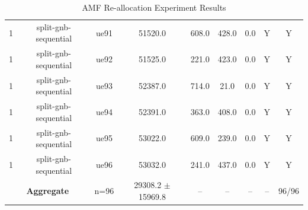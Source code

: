 \begin{table}[ht]
\begin{tabular}{|c|c|c|c|c|c|c|c|c|}
1 & split-gnb-sequential & ue91 & 51520.0 & 608.0 & 428.0 & 0.0 & Y & Y \\
1 & split-gnb-sequential & ue92 & 51525.0 & 221.0 & 423.0 & 0.0 & Y & Y \\
1 & split-gnb-sequential & ue93 & 52387.0 & 714.0 & 21.0 & 0.0 & Y & Y \\
1 & split-gnb-sequential & ue94 & 52391.0 & 363.0 & 408.0 & 0.0 & Y & Y \\
1 & split-gnb-sequential & ue95 & 53022.0 & 609.0 & 239.0 & 0.0 & Y & Y \\
1 & split-gnb-sequential & ue96 & 53032.0 & 241.0 & 437.0 & 0.0 & Y & Y \\
\multicolumn{2}{|c|}{\textbf{Aggregate}} & n=96 & 29308.2 $\pm$ 15969.8 & -- & -- & -- & -- & 96/96 \\
\hline
\end{tabular}
\caption{AMF Re-allocation Experiment Results}
\label{tab:amf_realloc}
\end{table}
